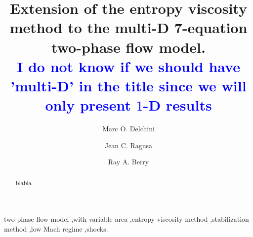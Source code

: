 \documentclass[preprint,10pt]{elsarticle}
\newcommand{\tcb}[1]{\textcolor{blue}{#1}}
\begin{document}
\begin{frontmatter}


\title{Extension of the entropy viscosity method to the multi-D 7-equation two-phase flow model.\\
\tcb{I do not know if we should have 'multi-D' in the title since we will only present $1$-D results}}
\author{Marc O. Delchini}

\author{Jean C. Ragusa}

\author{Ray A. Berry}

\address[label1]{Department of Nuclear Engineering, Texas A\&M University, College Station, TX 77843, USA }

\address[label2]{Idaho National Laboratory, Idaho Falls, ID 83415, USA }

\begin{abstract}
blabla
\end{abstract}
\begin{keyword}
  two-phase flow model \sep with variable area \sep entropy viscosity method \sep stabilization method \sep low Mach regime \sep shocks.
\end{keyword}
\end{frontmatter}
\linenumbers
\end{document}
